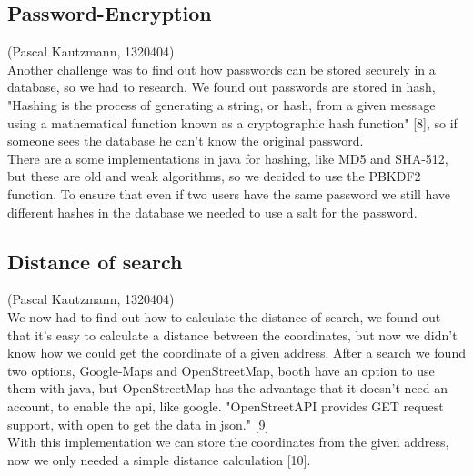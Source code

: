 \documentclass[a4paper, 12pt]{report}
\begin{document}
\subsection{Password-Encryption}
{\tiny (Pascal Kautzmann, 1320404)\\}
Another challenge was to find out how passwords can be stored securely in a database, so we had to research. We found out passwords are stored in hash, "Hashing is the process of generating a string, or hash, from a given message using a mathematical function known as a cryptographic hash function" [8], so if someone sees the database he can't know the original password. \\
There are a some implementations in java for hashing, like MD5 and SHA-512, but these are old and weak algorithms, so we decided to use the PBKDF2 function. To ensure that even if two users have the same password we still have different hashes in the database we needed to use a salt for the password.


\subsection{Distance of search}
{\tiny (Pascal Kautzmann, 1320404)\\}
We now had to find out how to calculate the distance of search, we found out that it's easy to calculate a distance between the coordinates, but now we didn't know how we could get the coordinate of a given address. After a search we found two options, Google-Maps and OpenStreetMap, booth have an option to use them with java, but OpenStreetMap has the advantage
that it doesn't need an account, to enable the api, like google. "OpenStreetAPI provides GET request support, with open to get the data in json." [9]\\
With this implementation we can store the coordinates from the given address, now we only needed a simple distance calculation [10]. 
 
\end{document}
